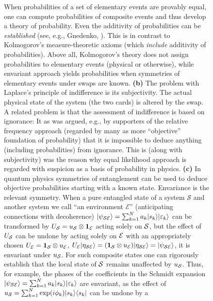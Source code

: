 \documentclass[aps,amsmath,amssymb,amsfonts,12pt]{revtex4-1}
\newcommand{\cS}        {{\mathcal S}}
\newcommand{\cE}        {{\mathcal E}}
\newcommand{\+}         {\dagger}
\begin{document}
{\begin{figure}[ht]
{When probabilities of a set of elementary events are provably equal, one
can compute probabilities of composite events and thus develop a theory of probability. Even the
additivity of probabilities can be {\it established} (see, e.g., Gnedenko, \cite{32}).
This is in contrast to Kolmogorov's measure-theoretic
axioms (which {\it include} additivity of probabilities). Above all, Kolmogorov's theory does not assign probabilities to elementary events (physical or otherwise), while envariant approach yields probabilities when symmetries of elementary events under swaps are known. 
{\bf (b)} The problem with Laplace's principle of indifference is its subjectivity.
The actual physical state of the system (the two cards) is altered by
the swap.  A related problem is that the assessment of indifference is based on ignorance: It
as was argued, e.g., by supporters of the relative frequency approach (regarded by many as more ``objective'' foundation of probability) that it is impossible to deduce anything 
(including probabilities) from ignorance. This is (along with subjectivity) was the reason why equal likelihood approach
is regarded with suspicion as a basis of probability in physics.
{\bf (c)} In quantum physics symmetries of entanglement can be used to deduce objective
probabilities starting with a known state. Envariance is the relevant symmetry.
When a pure entangled state of a system $\cS$ and another system we call ``an environment $\cE$'' (anticipating connections with decoherence) $
|\psi_{\cal SE}\rangle = \sum_{k=1}^N a_k |s_k\rangle |\varepsilon_k\rangle $ can be transformed
by $U_{\cal S}=u_{\cal S} \otimes {\bf 1}_{\cal E}$ acting solely on ${\cal S}$, but the effect of $U_{\cal S}$ can be undone by acting solely on ${\cal E}$ with an appropriately chosen $U_{\cal E}=
{\bf 1}_{\cal S} \otimes u_{\cal E}$, $U_{\cal E}|\eta_{\cal SE}\rangle  = ({\bf 1}_{\cal S} \otimes
u_{\cal E}) |\eta_{\cal SE}\rangle = |\psi_{\cal SE}\rangle $, it is envariant under $u_{\cal S}$. For such
composite states one can rigorously establish that the local state of ${\cal S}$ remains unaffected by
$u_{\cal S}$. Thus, for example, the phases of the coefficients in the Schmidt expansion
$|\psi_{\cal SE}\rangle = \sum_{k=1}^N a_k |s_k\rangle |\varepsilon_k\rangle $ are envariant, as the effect of $u_{\cal S}=\sum_{k=1}^N \exp(i \phi_k)|s_k\rangle \langle s_k| $ can be undone by a
}
\end{figure}}
\end{document}
